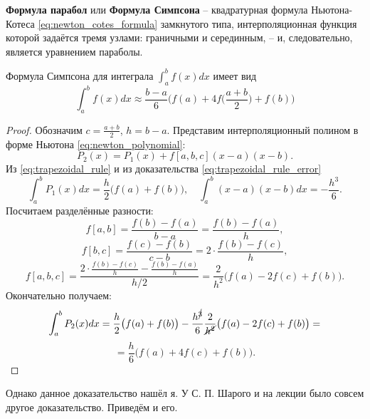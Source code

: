 \documentclass[../main.tex]{subfile}
\begin{document}
\begin{define}
	\textbf{Формула парабол} или \textbf{Формула Симпсона} -- квадратурная
	формула Ньютона-Котеса \eqref{eq:newton_cotes_formula} замкнутого типа,
	интерполяционная функция которой задаётся тремя узлами: граничными и
	серединным, -- и, следовательно, является уравнением параболы.
\end{define}

\begin{theorem}\label{eq:simpsons_rule}
	Формула Симпсона для интеграла $\int_a^b f(x)dx$ имеет вид
	\[\boxed{\int_a^b f(x)dx\approx\frac{b-a}{6}\Big(f(a)+4f\big(\frac{a+b}
	{2}\big)+f(b)\Big)}\]
\end{theorem}

\begin{proof}
	Обозначим $c=\frac{a+b}{2}$, $h=b-a$. Представим интерполяционный полином
	в форме Ньютона
	\eqref{eq:newton_polynomial}:
	\[P_2(x)=P_1(x)+f[a,b,c](x-a)(x-b).\]
	Из \eqref{eq:trapezoidal_rule} и из доказательства
	\eqref{eq:trapezoidal_rule_error}
	\[\int_a^b P_1(x)dx=\frac{h}{2}\big(f(a)+f(b)\big),\quad\int_a^b (x-a)
	(x-b)dx=-\frac{h^3}{6}.\]
	Посчитаем разделённые разности:
	\[f[a,b]=\frac{f(b)-f(a)}{b-a}=\frac{f(b)-f(a)}{h},\]
	\[f[b,c]=\frac{f(c)-f(b)}{c-b}=2\cdot\frac{f(b)-f(c)}{h},\]
	\[f[a,b,c]=\frac{2\cdot\frac{f(b)-f(c)}{h}-\frac{f(b)-f(a)}{h}}{h/2}=
	\frac{2}{h^2}\big(f(a)-2f(c)+f(b)\big).\]
	Окончательно получаем:
	\[\int_a^b P_2(x)dx=\frac{h}{2}\big(f(a)+f(b)\big)-\frac{h^{\cancel{3}}}
	{6}\frac{2}{\cancel{h^2}}\big(f(a)-2f(c)+f(b)\big)=\]
	\[=\frac{h}{6}\big(f(a)+4f(c)+f(b)\big).\]
\end{proof}

Однако данное доказательство нашёл я. У С. П. Шарого и на лекции было совсем
другое доказательство. Приведём и его.
\end{document}
